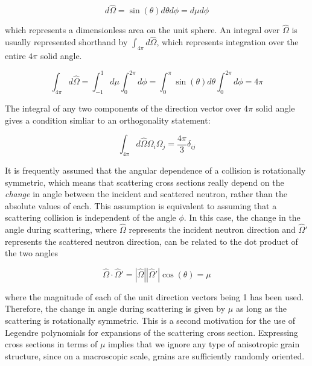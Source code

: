 \documentclass[10pt]{article}
\begin{document}
\begin{flushleft}
\begin{equation} %
\label{eq:DifferentialOmega}
d\hat{\Omega}=\sin{(\theta)}d\theta d\phi=d\mu d\phi
\end{equation}

which represents a dimensionless area on the unit sphere. An integral over \(\hat{\Omega}\) is usually represented shorthand by \(\int_{4\pi}^{ } d\hat{\Omega}\), which represents integration over the entire \(4\pi\) solid angle.

\begin{equation}
\label{eq:4PiOmegaIntegral}
\int_{4\pi}^{ } d\hat{\Omega} = \int_{-1}^{1} d\mu \int_{0}^{2\pi} d\phi = \int_{0}^{\pi} \sin{(\theta)}d\theta \int_{0}^{2\pi} d\phi = 4\pi
\end{equation}

The integral of any two components of the direction vector over \(4\pi\) solid angle gives a condition simliar to an orthogonality statement:

\begin{equation}
\label{eq:4PiOmegaOmega}
\int_{4\pi}^{ } d\hat{\Omega}\Omega_i\Omega_j = \frac{4\pi}{3}\delta_{ij}
\end{equation}

It is frequently assumed that the angular dependence of a collision is rotationally symmetric, which means that scattering cross sections really depend on the \textit{change} in angle between the incident and scattered neutron, rather than the absolute values of each. This assumption is equivalent to assuming that a scattering collision is independent of the angle \(\phi\). In this case, the change in the angle during scattering, where \(\hat{\Omega}\) represents the incident neutron direction and \(\hat{\Omega}'\) represents the scattered neutron direction, can be related to the dot product of the two angles

\begin{equation}
\label{eq:OmegaDotOmega}
\hat{\Omega}\cdot\hat{\Omega}' = |\hat{\Omega}||\hat{\Omega}'| \cos{(\theta)} = \mu
\end{equation} 

where the magnitude of each of the unit direction vectors being 1 has been used. Therefore, the change in angle during scattering is given by \(\mu\) as long as the scattering is rotationally symmetric. This is a second motivation for the use of Legendre polynomials for expansions of the scattering cross section. Expressing cross sections in terms of \(\mu\) implies that we ignore any type of anisotropic grain structure, since on a macroscopic scale, grains are sufficiently randomly oriented. 


\end{flushleft}
\end{document}
